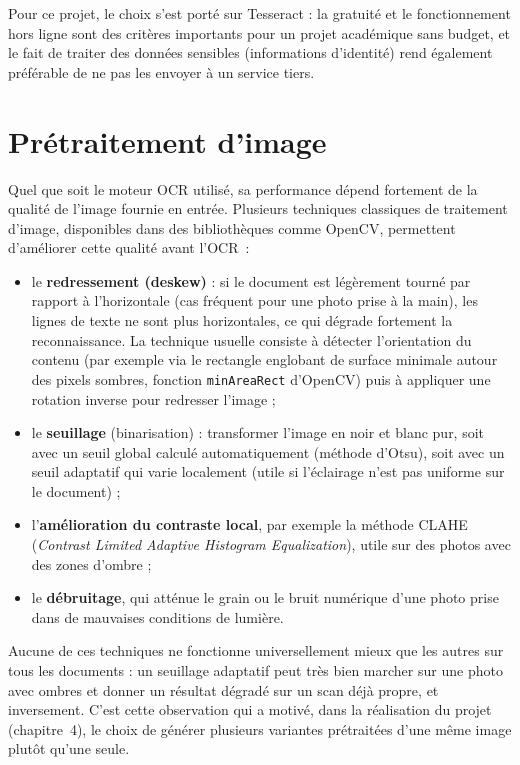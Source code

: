 Pour ce projet, le choix s'est porté sur Tesseract : la gratuité et le fonctionnement hors ligne sont des critères importants pour un projet académique sans budget, et le fait de traiter des données sensibles (informations d'identité) rend également préférable de ne pas les envoyer à un service tiers.

\section{Prétraitement d'image}

Quel que soit le moteur OCR utilisé, sa performance dépend fortement de la qualité de l'image fournie en entrée. Plusieurs techniques classiques de traitement d'image, disponibles dans des bibliothèques comme OpenCV, permettent d'améliorer cette qualité avant l'OCR~:

\begin{itemize}
  \item le \textbf{redressement (deskew)} : si le document est légèrement tourné par rapport à l'horizontale (cas fréquent pour une photo prise à la main), les lignes de texte ne sont plus horizontales, ce qui dégrade fortement la reconnaissance. La technique usuelle consiste à détecter l'orientation du contenu (par exemple via le rectangle englobant de surface minimale autour des pixels sombres, fonction \texttt{minAreaRect} d'OpenCV) puis à appliquer une rotation inverse pour redresser l'image ;
  \item le \textbf{seuillage} (binarisation) : transformer l'image en noir et blanc pur, soit avec un seuil global calculé automatiquement (méthode d'Otsu), soit avec un seuil adaptatif qui varie localement (utile si l'éclairage n'est pas uniforme sur le document) ;
  \item l'\textbf{amélioration du contraste local}, par exemple la méthode CLAHE (\textit{Contrast Limited Adaptive Histogram Equalization}), utile sur des photos avec des zones d'ombre ;
  \item le \textbf{débruitage}, qui atténue le grain ou le bruit numérique d'une photo prise dans de mauvaises conditions de lumière.
\end{itemize}

Aucune de ces techniques ne fonctionne universellement mieux que les autres sur tous les documents : un seuillage adaptatif peut très bien marcher sur une photo avec ombres et donner un résultat dégradé sur un scan déjà propre, et inversement. C'est cette observation qui a motivé, dans la réalisation du projet (chapitre~4), le choix de générer plusieurs variantes prétraitées d'une même image plutôt qu'une seule.

